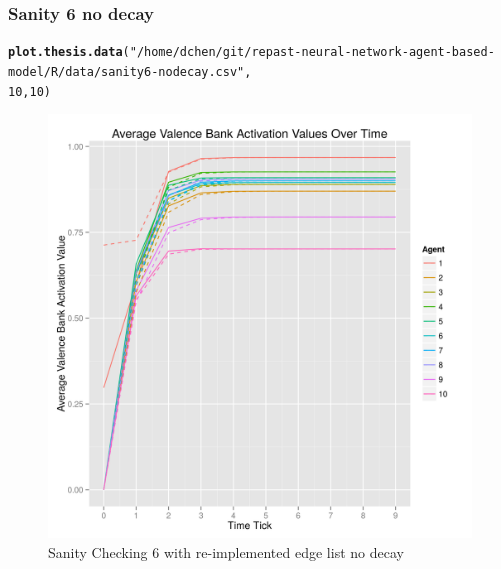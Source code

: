 \documentclass{article}\usepackage[]{graphicx}\usepackage[]{color}
\makeatletter
\def\maxwidth{ %
  \ifdim\Gin@nat@width>\linewidth
    \linewidth
  \else
    \Gin@nat@width
  \fi
}
\newcommand{\hlnum}[1]{\textcolor[rgb]{0.686,0.059,0.569}{#1}}%
\newcommand{\hlstr}[1]{\textcolor[rgb]{0.192,0.494,0.8}{#1}}%
\newcommand{\hlstd}[1]{\textcolor[rgb]{0.345,0.345,0.345}{#1}}%
\newcommand{\hlkwd}[1]{\textcolor[rgb]{0.737,0.353,0.396}{\textbf{#1}}}%
\newenvironment{kframe}{%
 \def\at@end@of@kframe{}%
 \ifinner\ifhmode%
  \def\at@end@of@kframe{\end{minipage}}%
  \begin{minipage}{\columnwidth}%
 \fi\fi%
 \def\FrameCommand##1{\hskip\@totalleftmargin \hskip-\fboxsep
 \colorbox{shadecolor}{##1}\hskip-\fboxsep
     \hskip-\linewidth \hskip-\@totalleftmargin \hskip\columnwidth}%
 \MakeFramed {\advance\hsize-\width
   \@totalleftmargin\z@ \linewidth\hsize
   \@setminipage}}%
 {\par\unskip\endMakeFramed%
 \at@end@of@kframe}
\newenvironment{knitrout}{}{} %
\makeatother
\begin{document}
\subsubsection{Sanity 6 no decay}
\begin{knitrout}
\color{fgcolor}\begin{kframe}
\begin{alltt}
\hlkwd{plot.thesis.data}\hlstd{(}\hlstr{"/home/dchen/git/repast-neural-network-agent-based-model/R/data/sanity6-nodecay.csv"}\hlstd{,}
    \hlnum{10}\hlstd{,} \hlnum{10}\hlstd{)}
\end{alltt}
\end{kframe}\begin{figure}[]

\includegraphics[width=\maxwidth]{figure/plot-sanity-6-nodecay} \caption[Sanity Checking 6 with re-implemented edge list no decay]{Sanity Checking 6 with re-implemented edge list no decay\label{fig:plot-sanity-6-nodecay}}
\end{figure}


\end{knitrout}


\newpage
\end{document}
